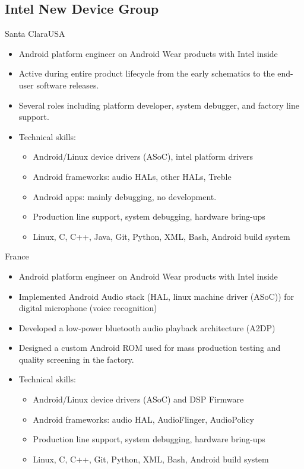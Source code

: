 \documentclass[a4paper,10pt,sans]{moderncv}
\begin{document}
\subsection{Intel New Device Group}
{Santa Clara}{USA}
{%
  \begin{itemize}
  \item Android platform engineer on Android Wear products with Intel inside
  \item Active during entire product lifecycle from the early schematics to the end-user software releases.
  \item Several roles including platform developer, system debugger, and factory line support.
  \item Technical skills:
    \begin{itemize}
    \item Android/Linux device drivers (ASoC), intel platform drivers
    \item Android frameworks: audio HALs, other HALs, Treble
    \item Android apps: mainly debugging, no development.
    \item Production line support, system debugging, hardware bring-ups
    \item Linux, C, C++, Java, Git, Python, XML, Bash, Android build system
    \end{itemize}
  \end{itemize}
}

{}{France}
{
    \begin{itemize}
    \item Android platform engineer on Android Wear products with Intel inside
    \item Implemented Android Audio stack (HAL, linux machine driver (ASoC)) for digital microphone (voice recognition)
    \item Developed a low-power bluetooth audio playback architecture (A2DP)
    \item Designed a custom Android ROM used for mass production testing and quality screening in the factory.
    \item Technical skills:
      \begin{itemize}
        \item Android/Linux device drivers (ASoC) and DSP Firmware
        \item Android frameworks: audio HAL, AudioFlinger, AudioPolicy
        \item Production line support, system debugging, hardware bring-ups
        \item Linux, C, C++, Git, Python, XML, Bash, Android build system
      \end{itemize}
    \end{itemize}
}
\end{document}
